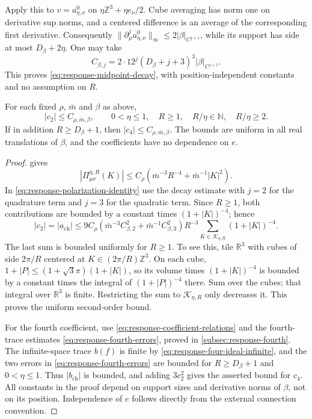 \documentclass[11pt,letterpaper,reqno]{amsart}
\newcommand{\R}{\mathbb R}
\newcommand{\Z}{\mathbb Z}
\newcommand{\N}{\mathbb N}
\begin{document}
Apply this to $v=a_{\eta,\nu}^0$ on
$\eta\Z^3+\eta e_\nu/2$. Cube averaging has norm one on
derivative sup norms, and a centered difference is an average
of the corresponding first derivative. Consequently
$\|\partial_\mu^ja_{\eta,\nu}^0\|_\infty
\le2|\beta|_{C^{j+1}}$, while its support has side at most
$D_\beta+2\eta$. One may take
\[
 C_{\beta,j}=2\cdot12^j(D_\beta+j+3)^3|\beta|_{C^{j+1}}.
\]
This proves \eqref{eq:response-midpoint-decay}, with position-independent
constants and no assumption on $R$.

\begin{proposition}\label{prop:response-uniform-coefficients}
For each fixed $\rho$, $\bar m$ and $\beta$ as above,
\[
 |c_2|\le C_{\rho,\bar m,\beta},
              \qquad 0<\eta\le1,\quad R\ge1,\quad
                         R/\eta\in\N,\quad R/\eta\ge2.
\]
If in addition $R\ge D_\beta+1$, then
$|c_4|\le C_{\rho,\bar m,\beta}$.
The bounds are uniform in all real translations of $\beta$,
and the coefficients have no dependence on $e$.
\end{proposition}

\begin{proof}
 gives
\[
 |\Pi^{\eta,R}_{\mu\nu}(K)|
   \le C_\rho(\bar m^{-3}R^{-4}+\bar m^{-1}|K|^2).
\]
In \eqref{eq:response-polarization-identity} use the decay
estimate with $j=2$ for the quadrature term and $j=3$ for
the quadratic term. Since $R\ge1$, both contributions are
bounded by a constant times $(1+|K|)^{-4}$; hence
\[
 |c_2|=|a_{\mathrm{ch}}|
 \le9C_\rho
       (\bar m^{-3}C_{\beta,2}^2+\bar m^{-1}C_{\beta,3}^2)
       R^{-3}\sum_{K\in\mathcal K_{\eta,R}}(1+|K|)^{-4}.
\]
The last sum is bounded uniformly for $R\ge1$. To see this,
tile $\R^3$ with cubes of side $2\pi/R$ centered at
$K\in(2\pi/R)\Z^3$. On each cube,
$1+|P|\le(1+\sqrt3\pi)(1+|K|)$, so its volume times
$(1+|K|)^{-4}$ is bounded by a constant times the integral
of $(1+|P|)^{-4}$ there. Sum over the cubes; that integral
over $\R^3$ is finite. Restricting the sum to
$\mathcal K_{\eta,R}$ only decreases it. This proves the
uniform second-order bound.

For the fourth coefficient, use
\eqref{eq:response-coefficient-relations} and
the fourth-trace estimates \eqref{eq:response-fourth-errors}, proved in \cref{subsec:response-fourth}. The infinite-space
trace $b(f)$ is finite by \eqref{eq:response-four-ideal-infinite},
and the two errors in \eqref{eq:response-fourth-errors} are
bounded for $R\ge D_\beta+1$ and $0<\eta\le1$.
Thus $|b_{\mathrm{ch}}|$ is bounded, and adding $3c_2^2$
gives the asserted bound for $c_4$. All constants in the
proof depend on support sizes and derivative norms of $\beta$,
not on its position. Independence of $e$ follows directly
from the external connection convention.
\end{proof}
\end{document}
